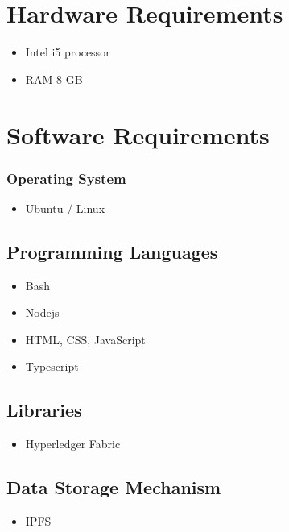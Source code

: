 \documentclass[11pt]{report}
\begin{document}
        \section{Hardware Requirements}
                \begin{itemize}
                    \item Intel i5 processor
                    \item RAM 8 GB
                \end{itemize}
        \section{Software Requirements}  
                \subsubsection{Operating System}
                            \begin{itemize}
                                \item Ubuntu / Linux
                            \end{itemize} 
                \subsection{Programming Languages}
                            \begin{itemize}
                                \item Bash
                                \item Nodejs
                                \item HTML, CSS, JavaScript
                                \item Typescript
                            \end{itemize}
                 \subsection{Libraries}       
                                \begin{itemize}
                                    \item Hyperledger Fabric
                                \end{itemize}
                \subsection{Data Storage Mechanism}     
                                \begin{itemize}
                                    \item IPFS
                                \end{itemize}
                    
\end{document}
